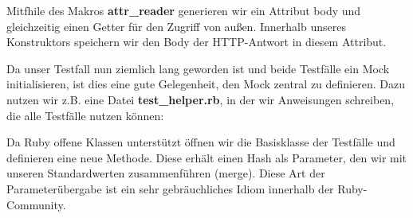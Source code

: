 Mitfhile des Makros \textbf{attr\_reader} generieren wir ein Attribut body und gleichzeitig einen Getter für den Zugriff von außen. Innerhalb unseres Konstruktors speichern wir den Body der HTTP-Antwort in diesem Attribut.
\tddgreen

Da unser Testfall nun ziemlich lang geworden ist und beide Testfälle ein Mock initialisieren, ist dies eine gute Gelegenheit, den Mock zentral zu definieren. Dazu nutzen wir z.B. eine Datei \textbf{test\_helper.rb}, in der wir Anweisungen schreiben, die alle Testfälle nutzen können:
\tddrefactor

\begin{ruby}[label=test/test\_helper.rb]
 
   
      
        
        
        
      
      \PY{o}{[}\PY{o}{]}
      \PY{o}{[}\PY{o}{]}
    \PY{o}{[}\PY{o}{]}
\end{ruby}

Da Ruby offene Klassen unterstützt öffnen wir die Basisklasse der Testfälle und definieren eine neue Methode. Diese erhält einen Hash als Parameter, den wir mit unseren Standardwerten zusammenführen (merge). Diese Art der Parameterübergabe ist ein sehr gebräuchliches Idiom innerhalb der Ruby-Community.
\tddrefactor

